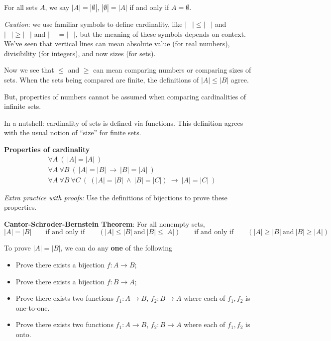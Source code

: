 \documentclass[12pt, oneside]{article}
\begin{document}
For all sets $A$, we say $|A| = |\emptyset|$, $|\emptyset| = |A|$ if and only if $A = \emptyset$. 

{\it Caution}: we use 
familiar symbols to define cardinality, like
$| \phantom{\cdots} | \leq | \phantom{\cdots} |$
and 
$| \phantom{\cdots} | \geq | \phantom{\cdots} |$
and 
$| \phantom{\cdots} | = | \phantom{\cdots} |$, 
but the meaning of these symbols depends on context.
We've seen that vertical lines can mean absolute
value (for real numbers), divisibility (for integers), 
and now sizes (for sets). 

Now we see that $\leq$ and $\geq$ can mean comparing
numbers or comparing sizes of sets. When the sets being 
compared are finite, the definitions 
of $|A| \leq |B|$ agree. 

But, properties of numbers cannot be assumed when comparing
cardinalities of infinite sets.

In a nutshell: cardinality of sets is defined via functions.
This definition agrees with the usual notion of ``size'' for 
finite sets. 

{\bf Properties of cardinality}
\begin{align*}
&\forall A ~ (~  |A| = |A| ~)\\
&\forall A ~ \forall B ~(~ |A| = |B|  ~\to ~ |B| = |A|~)\\
&\forall A ~ \forall B ~ \forall C~ (~ (|A| = |B| ~\wedge~ |B| = |C|) ~\to ~ |A| = |C|~)
\end{align*}

{\it Extra practice with proofs:} Use the definitions of bijections to prove these properties. 

{\bf Cantor-Schroder-Bernstein Theorem}: For all nonempty sets,
\[
|A| = |B| \qquad\text{if and only if} \qquad (|A| \leq |B| ~\text{and}~ |B| \leq |A|)
\qquad\text{if and only if} \qquad (|A| \geq |B| ~\text{and}~ |B| \geq |A|)
\]

To prove $|A| = |B|$,  we can do any {\bf one} of the following

\begin{itemize}\setlength{\itemsep}{-5pt}
\item Prove there exists  a bijection $f:  A \to B$;
\item Prove there exists a  bijection  $f: B  \to  A$;
\item Prove there exists two functions $f_1: A \to B$, $f_2: B \to  A$ where each of $f_1, f_2$ is one-to-one.
\item Prove there exists two functions $f_1: A \to B$, $f_2: B \to  A$ where each of $f_1, f_2$ is onto.
\end{itemize} \newpage
\end{document}

